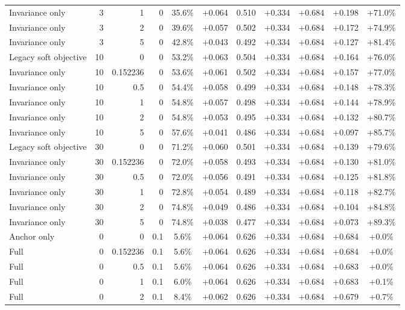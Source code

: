 \begin{table}[htbp]
\begin{tabular}{lrrrccccccc}
Invariance only & 3 & 1 & 0 & 35.6\% & +0.064 & 0.510 & +0.334 & +0.684 & +0.198 & +71.0\% \\
Invariance only & 3 & 2 & 0 & 39.6\% & +0.057 & 0.502 & +0.334 & +0.684 & +0.172 & +74.9\% \\
Invariance only & 3 & 5 & 0 & 42.8\% & +0.043 & 0.492 & +0.334 & +0.684 & +0.127 & +81.4\% \\
Legacy soft objective & 10 & 0 & 0 & 53.2\% & +0.063 & 0.504 & +0.334 & +0.684 & +0.164 & +76.0\% \\
Invariance only & 10 & 0.152236 & 0 & 53.6\% & +0.061 & 0.502 & +0.334 & +0.684 & +0.157 & +77.0\% \\
Invariance only & 10 & 0.5 & 0 & 54.4\% & +0.058 & 0.499 & +0.334 & +0.684 & +0.148 & +78.3\% \\
Invariance only & 10 & 1 & 0 & 54.8\% & +0.057 & 0.498 & +0.334 & +0.684 & +0.144 & +78.9\% \\
Invariance only & 10 & 2 & 0 & 54.8\% & +0.053 & 0.495 & +0.334 & +0.684 & +0.132 & +80.7\% \\
Invariance only & 10 & 5 & 0 & 57.6\% & +0.041 & 0.486 & +0.334 & +0.684 & +0.097 & +85.7\% \\
Legacy soft objective & 30 & 0 & 0 & 71.2\% & +0.060 & 0.501 & +0.334 & +0.684 & +0.139 & +79.6\% \\
Invariance only & 30 & 0.152236 & 0 & 72.0\% & +0.058 & 0.493 & +0.334 & +0.684 & +0.130 & +81.0\% \\
Invariance only & 30 & 0.5 & 0 & 72.0\% & +0.056 & 0.491 & +0.334 & +0.684 & +0.125 & +81.8\% \\
Invariance only & 30 & 1 & 0 & 72.8\% & +0.054 & 0.489 & +0.334 & +0.684 & +0.118 & +82.7\% \\
Invariance only & 30 & 2 & 0 & 74.8\% & +0.049 & 0.486 & +0.334 & +0.684 & +0.104 & +84.8\% \\
Invariance only & 30 & 5 & 0 & 74.8\% & +0.038 & 0.477 & +0.334 & +0.684 & +0.073 & +89.3\% \\
Anchor only & 0 & 0 & 0.1 & 5.6\% & +0.064 & 0.626 & +0.334 & +0.684 & +0.684 & +0.0\% \\
Full & 0 & 0.152236 & 0.1 & 5.6\% & +0.064 & 0.626 & +0.334 & +0.684 & +0.684 & +0.0\% \\
Full & 0 & 0.5 & 0.1 & 5.6\% & +0.064 & 0.626 & +0.334 & +0.684 & +0.683 & +0.0\% \\
Full & 0 & 1 & 0.1 & 6.0\% & +0.064 & 0.626 & +0.334 & +0.684 & +0.683 & +0.1\% \\
Full & 0 & 2 & 0.1 & 8.4\% & +0.062 & 0.626 & +0.334 & +0.684 & +0.679 & +0.7\% \\

\end{tabular}
\end{table}

